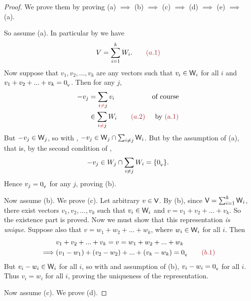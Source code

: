 \begin{proof}
We prove them by proving (a) \(\implies\) (b) \(\implies\) (c) \(\implies\) (d) \(\implies\) (e) \(\implies\) (a).

So assume (a).
In particular by  we have
\[
    V = \sum_{i = 1}^k W_i. \quad \quad \MAROON{(a.1)}
\]
Now suppose that \(v_1, v_2, ..., v_k\) are any vectors such that \(v_i \in \textsf{W}_i\) for all \(i\) and \(v_1 + v_2 + ... + v_k = 0_{_{\textsf{V}}}\).
Then for any \(j\),
\begin{align*}
    -v_j & = \sum_{i \RED{\ne} j} v_i & \text{of course} \\
         & \in \sum_{i \RED{\ne} j} W_i \quad \quad \MAROON{(a.2)} & \text{by \MAROON{(a.1)}}
\end{align*}
But \(-v_j \in \textsf{W}_j\), so with , \(-v_j \in \textsf{W}_j \cap \sum_{i \ne j} \textsf{W}_i\).
But by the assumption of (a), that is, by the second condition of ,
\[
    -v_j \in W_j \cap \sum_{i \ne j} W_i = \{ 0_{_{\textsf{V}}} \}.
\]
Hence \(v_j = 0_{_{\textsf{V}}}\) for any \(j\), proving (b).

Now assume (b). We prove (c).
Let arbitrary \(v \in \textsf{V}\).
By (b), since \(\textsf{V} = \sum_{i = 1}^k \textsf{W}_i\), there exist vectors \(v_1, v_2, ..., v_k\) such that \(v_i \in \textsf{W}_i\) and \(v = v_1 + v_2 + ... + v_k\).
So the existence part is proved.
Now we must show that this representation \emph{is unique}. Suppose also that \(v = w_1 + w_2 + ... + w_k\), where \(w_i \in \textsf{W}_i\) for all \(i\).
Then
\begin{align*}
             & v_1 + v_2 + ... + v_k = v = w_1 + w_2 + ... + w_k \\
    \implies & (v_1 - w_1) + (v_2 - w_2) + ... + (v_k - w_k) = \OV \quad \quad \MAROON{(b.1)}
\end{align*}
But \(v_i - w_i \in \textsf{W}_i\) for all \(i\), so with  and assumption of (b), \(v_i - w_i = 0_{_{\textsf{V}}}\) for all \(i\).
Thus \(v_i = w_i\) for all \(i\), proving the uniqueness of the representation.

Now assume (c). We prove (d).


\end{proof}

